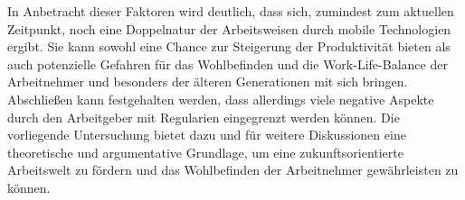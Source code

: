 \documentclass[12pt,a4paper]{article}
\begin{document}
In Anbetracht dieser Faktoren wird deutlich, dass sich, zumindest zum aktuellen Zeitpunkt, noch eine Doppelnatur der Arbeitsweisen durch mobile Technologien ergibt. Sie kann sowohl eine Chance zur Steigerung der Produktivität bieten als auch potenzielle Gefahren für das Wohlbefinden und die Work-Life-Balance der Arbeitnehmer und besonders der älteren Generationen mit sich bringen. Abschließen kann festgehalten werden, dass allerdings viele negative Aspekte durch den Arbeitgeber mit Regularien eingegrenzt werden können. Die vorliegende Untersuchung bietet dazu und für weitere Diskussionen eine theoretische und argumentative Grundlage, um eine zukunftsorientierte Arbeitswelt zu fördern und das Wohlbefinden der Arbeitnehmer gewährleisten zu können. 
\end{document}
